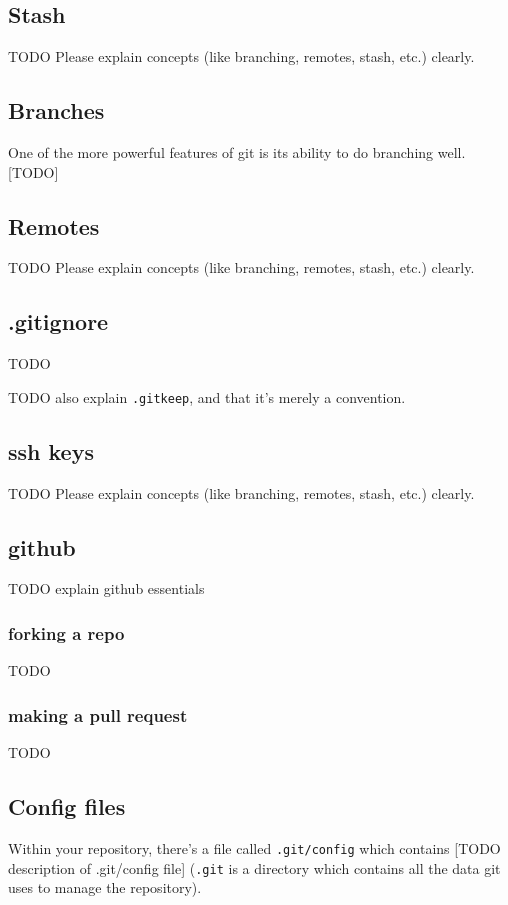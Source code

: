 \documentclass[12pt]{article}
\begin{document}
\subsection{Stash}
TODO
Please explain concepts (like branching, remotes, stash, etc.) clearly.

\subsection{Branches}
One of the more powerful features of git is its ability to do branching well. [TODO]

\subsection{Remotes}
TODO
Please explain concepts (like branching, remotes, stash, etc.) clearly.

\subsection{.gitignore}
TODO

TODO also explain \texttt{.gitkeep}, and that it's merely a convention.


\subsection{ssh keys}
TODO
Please explain concepts (like branching, remotes, stash, etc.) clearly.

\subsection{github}
TODO explain github essentials

\subsubsection{forking a repo}
TODO
\subsubsection{making a pull request}
TODO

\subsection{Config files}
Within your repository, there's a file called \texttt{.git/config} which contains [TODO description of .git/config file] (\texttt{.git} is a directory which contains all the data git uses to manage the repository).
\end{document}
